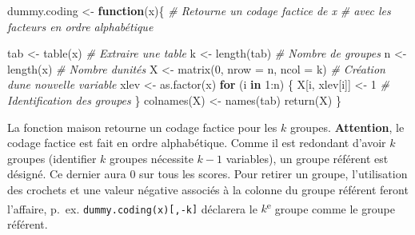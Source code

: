 \documentclass[
]{book}
\newenvironment{Shaded}{}{}
\newcommand{\AttributeTok}[1]{#1}
\newcommand{\CommentTok}[1]{\textit{#1}}
\newcommand{\ControlFlowTok}[1]{\textbf{#1}}
\newcommand{\DecValTok}[1]{#1}
\newcommand{\FunctionTok}[1]{#1}
\newcommand{\NormalTok}[1]{#1}
\newcommand{\OtherTok}[1]{#1}
\newcommand{\SpecialCharTok}[1]{#1}
\begin{document}
\begin{Shaded}
\begin{Highlighting}[]
\NormalTok{dummy.coding }\OtherTok{\textless{}{-}} \ControlFlowTok{function}\NormalTok{(x)\{}
  \CommentTok{\# Retourne un codage factice de x}
  \CommentTok{\# avec les facteurs en ordre alphabétique}
  
\NormalTok{  tab }\OtherTok{\textless{}{-}} \FunctionTok{table}\NormalTok{(x)    }\CommentTok{\# Extraire une table}
\NormalTok{  k }\OtherTok{\textless{}{-}} \FunctionTok{length}\NormalTok{(tab)   }\CommentTok{\# Nombre de groupes}
\NormalTok{  n }\OtherTok{\textless{}{-}} \FunctionTok{length}\NormalTok{(x)     }\CommentTok{\# Nombre d\textquotesingle{}unités}
\NormalTok{  X }\OtherTok{\textless{}{-}} \FunctionTok{matrix}\NormalTok{(}\DecValTok{0}\NormalTok{, }\AttributeTok{nrow =}\NormalTok{ n, }\AttributeTok{ncol =}\NormalTok{ k) }\CommentTok{\# Création d\textquotesingle{}une nouvelle variable }
\NormalTok{  xlev }\OtherTok{\textless{}{-}} \FunctionTok{as.factor}\NormalTok{(x)}
  \ControlFlowTok{for}\NormalTok{ (i }\ControlFlowTok{in} \DecValTok{1}\SpecialCharTok{:}\NormalTok{n) \{}
\NormalTok{    X[i, xlev[i]] }\OtherTok{\textless{}{-}} \DecValTok{1} \CommentTok{\# Identification des groupes}
\NormalTok{  \}}
  \FunctionTok{colnames}\NormalTok{(X) }\OtherTok{\textless{}{-}} \FunctionTok{names}\NormalTok{(tab)}
  \FunctionTok{return}\NormalTok{(X)}
\NormalTok{\}}
\end{Highlighting}
\end{Shaded}

La fonction maison retourne un codage factice pour les \(k\) groupes. \textbf{Attention}, le codage factice est fait en ordre alphabétique. Comme il est redondant d'avoir \(k\) groupes (identifier \(k\) groupes nécessite \(k-1\) variables), un groupe référent est désigné. Ce dernier aura 0 sur tous les scores. Pour retirer un groupe, l'utilisation des crochets et une valeur négative associés à la colonne du groupe référent feront l'affaire, p.~ex. \texttt{dummy.coding(x){[},-k{]}} déclarera le \(k\)\textsuperscript{e} groupe comme le groupe référent.
\end{document}
